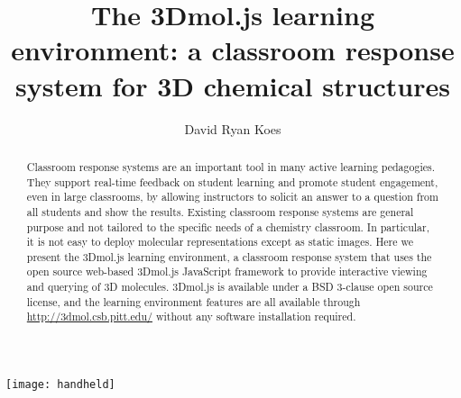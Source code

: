 \documentclass[journal=jceda8,manuscript=article]{achemso}
\author{David Ryan Koes}
\affiliation[Pitt]{Department of Computational and Systems Biology, University of Pittsburgh}
\title[3Dmol.js Learning Environment]
  {The 3Dmol.js learning environment: a classroom response system for 3D chemical structures}
\begin{document}
\begin{tocentry}
    \texttt{[image: handheld]}
\end{tocentry}

\begin{abstract}
Classroom response systems are an important tool in many active learning pedagogies.  They support real-time feedback on student learning and promote student engagement, even in large classrooms, by allowing instructors to solicit an answer to a question from all students and show the results. Existing classroom response systems are general purpose and not tailored to the specific needs of a chemistry classroom.  In particular, it is not easy to deploy molecular representations except as static images. Here we present the 3Dmol.js learning environment, a classroom response system that uses the open source web-based 3Dmol.js JavaScript framework to provide interactive viewing and querying of 3D molecules.  3Dmol.js is available under a BSD 3-clause open source license, and the learning environment features are all available through \url{http://3dmol.csb.pitt.edu/} without any software installation required.
\end{abstract}

\end{document}
